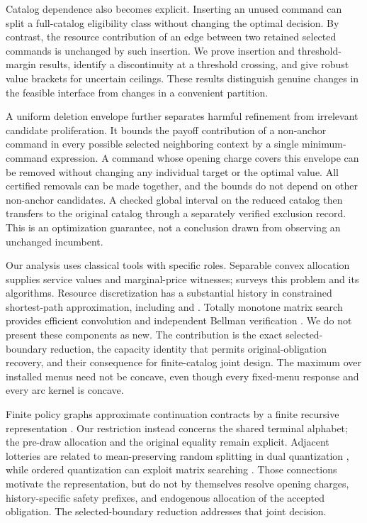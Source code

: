 Catalog dependence also becomes explicit. Inserting an unused command can split a full-catalog eligibility class without changing the optimal decision. By contrast, the resource contribution of an edge between two retained selected commands is unchanged by such insertion. We prove insertion and threshold-margin results, identify a discontinuity at a threshold crossing, and give robust value brackets for uncertain ceilings. These results distinguish genuine changes in the feasible interface from changes in a convenient partition.

A uniform deletion envelope further separates harmful refinement from irrelevant candidate proliferation. It bounds the payoff contribution of a non-anchor command in every possible selected neighboring context by a single minimum-command expression. A command whose opening charge covers this envelope can be removed without changing any individual target or the optimal value. All certified removals can be made together, and the bounds do not depend on other non-anchor candidates. A checked global interval on the reduced catalog then transfers to the original catalog through a separately verified exclusion record. This is an optimization guarantee, not a conclusion drawn from observing an unchanged incumbent.

Our analysis uses classical tools with specific roles. Separable convex allocation supplies service values and marginal-price witnesses; \citet{Patriksson2008} surveys this problem and its algorithms. Resource discretization has a substantial history in constrained shortest-path approximation, including \citet{Hassin1992} and \citet{LorenzRaz2001}. Totally monotone matrix search provides efficient convolution and independent Bellman verification \citep{Aggarwal1987}. We do not present these components as new. The contribution is the exact selected-boundary reduction, the capacity identity that permits original-obligation recovery, and their consequence for finite-catalog joint design. The maximum over installed menus need not be concave, even though every fixed-menu response and every arc kernel is concave.

Finite policy graphs approximate continuation contracts by a finite recursive representation \citep{Zhang2012}. Our restriction instead concerns the shared terminal alphabet; the pre-draw allocation and the original equality remain explicit. Adjacent lotteries are related to mean-preserving random splitting in dual quantization \citep{PagesWilbertz2012}, while ordered quantization can exploit matrix searching \citep{Wu1991}. Those connections motivate the representation, but do not by themselves resolve opening charges, history-specific safety prefixes, and endogenous allocation of the accepted obligation. The selected-boundary reduction addresses that joint decision.


